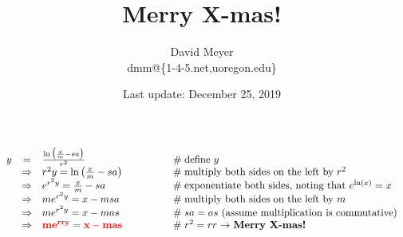 \documentclass[11pt, oneside]{article}   	%
\title{Merry X-mas!}
\author{David Meyer \\ dmm@\{1-4-5.net,uoregon.edu\}}
\date{Last update: December 25, 2019}
\theoremstyle{definition}
\begin{document}
\maketitle

\large {
\begin{equation*}
\begin{array}{rcll} 
y
&=& \frac{\ln \big (\frac{x}{m} -  sa  \big ) }{r^2}                                              &\qquad \qquad \mathrel{\#} \text{define $y$}                                                                   \\
&\Rightarrow& r^2 y                                = \ln \big (\frac{x}{m} -  sa  \big )    &\qquad \qquad  \mathrel{\#} \text{multiply both sides on the left by $r^2$}                      \\
&\Rightarrow& e^{r^2y}                           = \frac{x}{m} -  sa                           &\qquad \qquad \mathrel{\#} \text{exponentiate both sides, noting that $e^{\ln(x)} = x$}  \\
&\Rightarrow& m e^{r^2y}                       = x - msa                                        &\qquad \qquad \mathrel{\#} \text{multiply both sides on the left by $m$}                         \\
&\Rightarrow& m e^{r^2y}                       = x - mas                                        &\qquad \qquad \mathrel{\#} \text{$sa = as$ (assume multiplication is commutative)}      \\
&\Rightarrow& \bf{\color{red}{m e^{rry}   = x - mas}}                                     &\qquad \qquad \mathrel{\#} \text{$r^2 = rr \rightarrow$ \bf{Merry X-mas!}}
\end{array}
\end{equation*}
}
\end{document}

